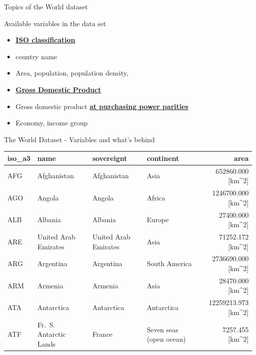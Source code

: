 \documentclass[
  10pt,
  ignorenonframetext,
]{beamer}
\providecommand{\tightlist}{%
  \setlength{\itemsep}{0pt}\setlength{\parskip}{0pt}}
\begin{document}
\begin{frame}{Topics of the World dataset}
\protect\hypertarget{topics-of-the-world-dataset}{}

\begin{block}{Available variables in the data set}

\begin{itemize}
\tightlist
\item
  \href{http://userpage.chemie.fu-berlin.de/diverse/doc/ISO_3166.html}{\textbf{ISO
  classification}}
\item
  country name
\item
  Area, population, population density,
\item
  \href{https://en.wikipedia.org/wiki/Gross_domestic_product}{\textbf{Gross
  Domestic Product}}
\item
  Gross domestic product
  \href{https://en.wikipedia.org/wiki/List_of_countries_by_GDP_\%28PPP\%29_per_capita}{\textbf{at
  purchasing power parities}}
\item
  Economy, income group
\end{itemize}

\end{block}

\end{frame}

\begin{frame}{The World Dataset - Variables and what's behind}
\protect\hypertarget{the-world-dataset---variables-and-whats-behind}{}

\begin{longtable}[]{@{}llllr@{}}
\toprule
iso\_a3 & name & sovereignt & continent & area\tabularnewline
\midrule
\endhead
AFG & Afghanistan & Afghanistan & Asia & 652860.000
{[}km\^{}2{]}\tabularnewline
AGO & Angola & Angola & Africa & 1246700.000
{[}km\^{}2{]}\tabularnewline
ALB & Albania & Albania & Europe & 27400.000
{[}km\^{}2{]}\tabularnewline
ARE & United Arab Emirates & United Arab Emirates & Asia & 71252.172
{[}km\^{}2{]}\tabularnewline
ARG & Argentina & Argentina & South America & 2736690.000
{[}km\^{}2{]}\tabularnewline
ARM & Armenia & Armenia & Asia & 28470.000 {[}km\^{}2{]}\tabularnewline
ATA & Antarctica & Antarctica & Antarctica & 12259213.973
{[}km\^{}2{]}\tabularnewline
ATF & Fr.~S. Antarctic Lands & France & Seven seas (open ocean) &
7257.455 {[}km\^{}2{]}\tabularnewline
\bottomrule
\end{longtable}

\end{frame}
\end{document}
